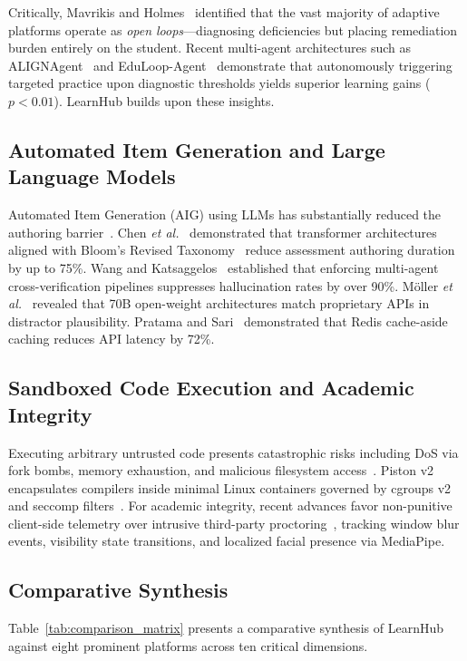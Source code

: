 \documentclass[journal]{IEEEtran}
\begin{document}
Critically, Mavrikis and Holmes~\cite{mavrikis2024} identified that the vast majority of adaptive platforms operate as \emph{open loops}---diagnosing deficiencies but placing remediation burden entirely on the student. Recent multi-agent architectures such as ALIGNAgent~\cite{zhang2025} and EduLoop-Agent~\cite{li2024} demonstrate that autonomously triggering targeted practice upon diagnostic thresholds yields superior learning gains ($p < 0.01$). LearnHub builds upon these insights.

\subsection{Automated Item Generation and Large Language Models}
Automated Item Generation (AIG) using LLMs has substantially reduced the authoring barrier~\cite{kasneci2023}. Chen \emph{et al.}~\cite{chen2025} demonstrated that transformer architectures aligned with Bloom's Revised Taxonomy~\cite{bloom1956, anderson2001} reduce assessment authoring duration by up to 75\%. Wang and Katsaggelos~\cite{wang2025} established that enforcing multi-agent cross-verification pipelines suppresses hallucination rates by over 90\%. M\"{o}ller \emph{et al.}~\cite{moller2024} revealed that 70B open-weight architectures match proprietary APIs in distractor plausibility. Pratama and Sari~\cite{pratama2025} demonstrated that Redis cache-aside caching reduces API latency by 72\%.

\subsection{Sandboxed Code Execution and Academic Integrity}
Executing arbitrary untrusted code presents catastrophic risks including DoS via fork bombs, memory exhaustion, and malicious filesystem access~\cite{caiza2020}. Piston v2 encapsulates compilers inside minimal Linux containers governed by cgroups v2 and seccomp filters~\cite{kumar2023, ihantola2010}. For academic integrity, recent advances favor non-punitive client-side telemetry over intrusive third-party proctoring~\cite{nigam2021}, tracking window blur events, visibility state transitions, and localized facial presence via MediaPipe.

\subsection{Comparative Synthesis}
Table~\ref{tab:comparison_matrix} presents a comparative synthesis of LearnHub against eight prominent platforms across ten critical dimensions.
\end{document}
